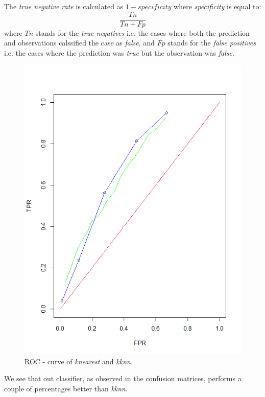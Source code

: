 \documentclass[a4paper,12pt]{article}
\begin{document}
The \textit{true negative rate} is calculated as \(1 - specificity\) where \textit{specificity} is equal to:
\begin{equation}
 \frac{Tn}{Tn + Fp}
\end{equation}
where \(Tn\) stands for the \textit{true negatives} i.e. the cases where both the prediction and observations calssified the case as \textit{false}, and \(Fp\) stands for the \textit{false positives} i.e. the cases where the prediction was \textit{true} but the observation was \textit{false}.

\begin{figure}[H]
\centering
\begin{minipage}[]{0.5\textwidth}
  \includegraphics[width=\textwidth]{figures/Lab1_A1_ROC.png}  
  \caption{ROC - curve of  \textit{knearest} and  \textit{kknn}.\label{fig:ROC - curve} }
 \end{minipage}
\end{figure}
We see that out classifier, as observed in the confusion matrices, performs a couple of percentages better than \textit{kknn}.
\end{document}
